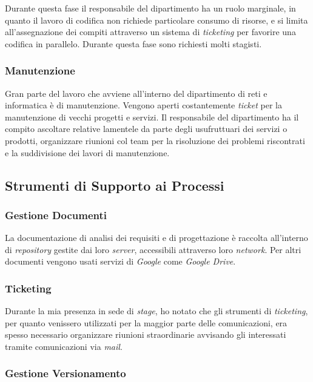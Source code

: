 Durante questa fase il responsabile del dipartimento ha un ruolo marginale, in quanto il lavoro di codifica non richiede particolare consumo di risorse, e si limita all'assegnazione dei compiti attraverso un sistema di \textit{ticketing} per favorire una codifica in parallelo. Durante questa fase sono richiesti molti stagisti.

\subsubsection{Manutenzione}

Gran parte del lavoro che avviene all'interno del dipartimento di reti e informatica è di manutenzione. Vengono aperti costantemente \textit{ticket} per la manutenzione di vecchi progetti e servizi. Il responsabile del dipartimento ha il compito  ascoltare relative lamentele da parte degli usufruttuari dei servizi o prodotti, organizzare riunioni col team per la risoluzione dei problemi riscontrati e la suddivisione dei lavori di manutenzione. 

\subsection{Strumenti di Supporto ai Processi}

\subsubsection{Gestione Documenti}
La documentazione di analisi dei requisiti e di progettazione è raccolta all'interno di \textit{repository} gestite dai loro \textit{server}, accessibili attraverso loro \textit{network}. Per altri documenti vengono usati servizi di \textit{Google} come \textit{Google Drive}.

\subsubsection{Ticketing}

Durante la mia presenza in sede di \textit{stage}, ho notato che gli strumenti di \textit{ticketing}, per quanto venissero utilizzati per la maggior parte delle comunicazioni, era spesso necessario organizzare riunioni straordinarie avvisando gli interessati tramite comunicazioni via \textit{mail}. 

\subsubsection{Gestione Versionamento}

